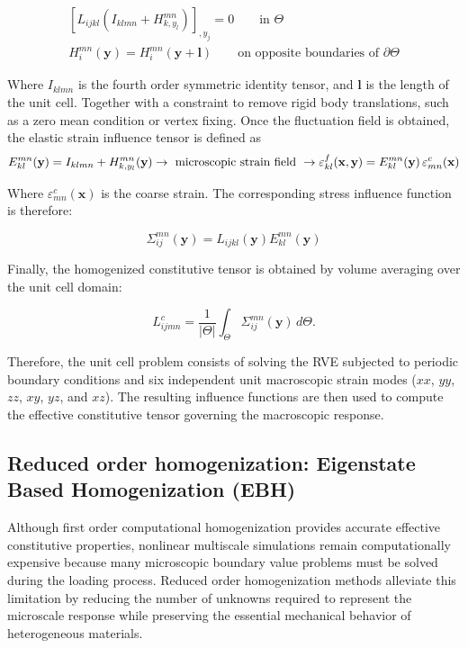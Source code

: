 \documentclass[12pt]{article}
\begin{document}
\begin{eqnarray}
\left[ L_{ijkl} \left( I_{klmn} + H^{mn}_{k,y_l} \right) \right]_{,y_j} = 0 \qquad \text{in } \Theta \\ 
H_i^{mn}(\mathbf{y}) = H_i^{mn}(\mathbf{y}+\mathbf{l}) \qquad \text{on opposite boundaries of } \partial \Theta
\end{eqnarray}

Where $I_{klmn}$ is the fourth order symmetric identity tensor, and $\mathbf{l}$ is the length of the unit cell.
Together with a constraint to remove rigid body translations, such as a zero mean condition or vertex fixing.
Once the fluctuation field is obtained, the elastic strain influence tensor is defined as
\begin{equation}
\notag E_{kl}^{mn}(\mathbf{y}) = I_{klmn} + H_{k,y_l}^{mn}(\mathbf{y}) \rightarrow \text{ microscopic strain field } \rightarrow \varepsilon_{kl}^{f}(\mathbf{x},\mathbf{y}) = E_{kl}^{mn}(\mathbf{y}) \, \varepsilon_{mn}^{c}(\mathbf{x})
\end{equation}

Where $\varepsilon_{mn}^{c}(\mathbf{x})$ is the coarse strain. The corresponding stress influence function is therefore:

\begin{equation}
\Sigma_{ij}^{mn}(\mathbf{y}) = L_{ijkl}(\mathbf{y}) E_{kl}^{mn}(\mathbf{y})
\end{equation}

Finally, the homogenized constitutive tensor is obtained by volume averaging over the unit cell domain:

\begin{equation}
L^{c}_{ijmn} = \frac{1}{|\Theta|} \int_{\Theta}\Sigma_{ij}^{mn}(\mathbf{y}) \,d\Theta.
\end{equation}

Therefore, the unit cell problem consists of solving the RVE subjected to periodic boundary conditions and six independent unit macroscopic strain modes ($xx$, $yy$, $zz$, $xy$, $yz$, and $xz$). The resulting influence functions are then used to compute the effective constitutive tensor governing the macroscopic response.

\subsection{Reduced order homogenization: Eigenstate Based Homogenization (EBH)}
Although first order computational homogenization provides accurate effective constitutive properties, nonlinear multiscale simulations remain computationally expensive because many microscopic boundary value problems must be solved during the loading process. Reduced order homogenization methods alleviate this limitation by reducing the number of unknowns required to represent the microscale response while preserving the essential mechanical behavior of heterogeneous materials.
\end{document}
